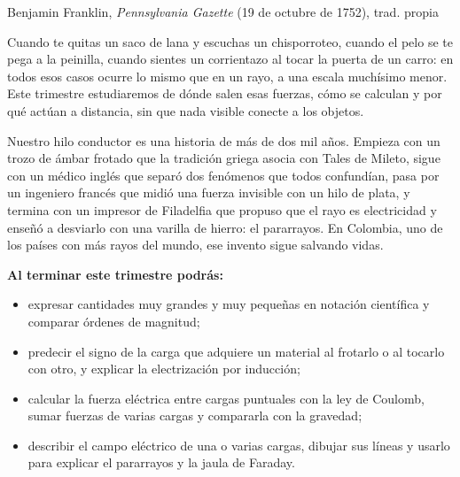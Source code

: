 \documentclass[11pt]{article}
\begin{document}
\encabezado

{Benjamin Franklin, \emph{Pennsylvania Gazette} (19 de octubre de 1752), trad. propia}


Cuando te quitas un saco de lana y escuchas un chisporroteo, cuando el pelo se
te pega a la peinilla, cuando sientes un corrientazo al tocar la puerta de un
carro: en todos esos casos ocurre lo mismo que en un rayo, a una escala
muchísimo menor. Este trimestre estudiaremos de dónde salen esas fuerzas, cómo
se calculan y por qué actúan a distancia, sin que nada visible conecte a los
objetos.

Nuestro hilo conductor es una historia de más de dos mil años. Empieza con un
trozo de ámbar frotado que la tradición griega asocia con Tales de Mileto,
sigue con un médico inglés que separó dos fenómenos que todos confundían, pasa
por un ingeniero francés que midió una fuerza invisible con un hilo de plata,
y termina con un impresor de Filadelfia que propuso que el rayo es
electricidad y enseñó a desviarlo con una varilla de hierro: el pararrayos. En
Colombia, uno de los países con más rayos del mundo, ese invento sigue
salvando vidas.

\textbf{Al terminar este trimestre podrás:}
\begin{itemize}
  \item expresar cantidades muy grandes y muy pequeñas en notación científica y
        comparar órdenes de magnitud;
  \item predecir el signo de la carga que adquiere un material al frotarlo o
        al tocarlo con otro, y explicar la electrización por inducción;
  \item calcular la fuerza eléctrica entre cargas puntuales con la ley de
        Coulomb, sumar fuerzas de varias cargas y compararla con la gravedad;
  \item describir el campo eléctrico de una o varias cargas, dibujar sus líneas
        y usarlo para explicar el pararrayos y la jaula de Faraday.
\end{itemize}
\end{document}
